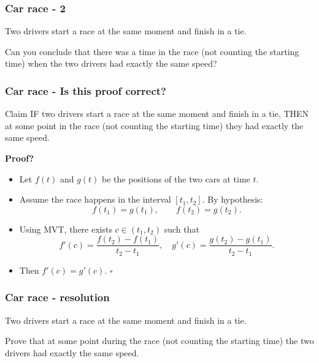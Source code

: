 \documentclass[14pt]{beamer}
\begin{document}

	\begin{frame}[t]
		\fontsize{13}{13}\selectfont
		\frametitle{Car race - 2}

		Two drivers start a race at the same moment and finish in a tie.

		Can you conclude that there was a time in the race (not counting the
		starting time) when the two drivers had exactly the same speed?
	\end{frame}

	\begin{frame}[t]
		\fontsize{13}{13}\selectfont
		\frametitle{Car race - Is this proof correct?}

		\begin{block}{\fontsize{13}{13}\selectfont Claim}
			IF two drivers start a race at the same moment and finish in a tie, THEN
			at some point in the race (not counting the starting time) they had
			exactly the same speed.
		\end{block}

		{\bfseries Proof?}
		\begin{itemize}
			\item Let $f(t)$ and $g(t)$ be the positions of the two cars at time $t$.

			\item Assume the race happens in the interval $[t_{1},t_{2}]$. By
				hypothesis:
				\[
					f(t_{1}) = g(t_{1}), \quad \quad f(t_{2}) = g(t_{2}).
				\]

			\item Using MVT, there exists $c \in (t_{1}, t_{2})$ such that
				\[
					f'(c) = \frac{f(t_{2}) - f(t_{1})}{t_{2}- t_{1}}, \quad g'(c) = \frac{g(t_{2})
					- g(t_{1})}{t_{2}- t_{1}}.
				\]

			\item Then $f'(c) = g'(c)$. \hfill $\square$
		\end{itemize}
	\end{frame}


	\begin{frame}[t]
		\fontsize{13}{13}\selectfont
		\frametitle{Car race - resolution}

		Two drivers start a race at the same moment and finish in a tie.

		Prove that at some point during the race (not counting the starting time) the
		two drivers had exactly the same speed.
	\end{frame}
\end{document}
